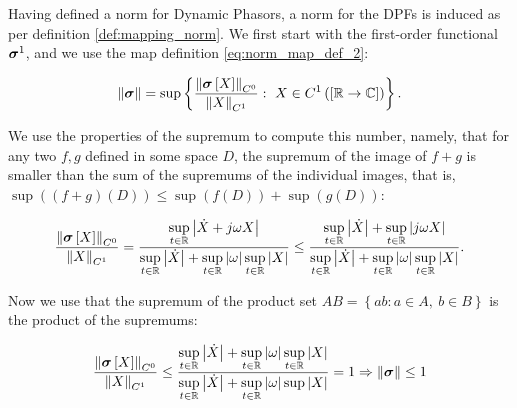 	Having defined a norm for Dynamic Phasors, a norm for the DPFs is induced as per definition \ref{def:mapping_norm}. We first start with the first-order functional $\boldsymbol{\sigma}^{1}$, and we use the map definition \eqref{eq:norm_map_def_2}:

\begin{equation} \left\lVert \dpo\right\rVert = \sup\left\{ \dfrac{\left\lVert \dpo\left[X\right]\right\rVert_{C^0}}{\left\lVert X\right\rVert_{C^1}}:\ X\in C^1\left(\left[\mathbb{R}\to\mathbb{C}\right]\right)\right\} .\end{equation}

	 We use the properties of the supremum to compute this number, namely, that for any two $f,g$ defined in some space $D$, the supremum of the image of $f+g$ is smaller than the sum of the supremums of the individual images, that is, $\sup\left( (f+g)(D)\right) \leq \sup(f(D)) + \sup(g(D))$:

\begin{equation}
	\dfrac{\left\lVert \boldsymbol{\sigma}\left[X\right]\right\rVert_{C^0}}{\left\lVert X\right\rVert_{C^1}} = \dfrac{\sup\limits_{t\in\mathbb{R}}\left\lvert \dot{X} + j\omega X\right\rvert}{\sup\limits_{t\in\mathbb{R}}\left\lvert \dot{X} \right\rvert + \sup\limits_{t\in\mathbb{R}}\left\lvert \omega\right\rvert\sup\limits_{t\in\mathbb{R}}\left\lvert X\right\rvert} \leq \dfrac{\sup\limits_{t\in\mathbb{R}}\left\lvert \dot{X}\right\rvert + \sup\limits_{t\in\mathbb{R}} \left\lvert j\omega X\right\rvert}{\sup\limits_{t\in\mathbb{R}}\left\lvert \dot{X} \right\rvert + \sup\limits_{t\in\mathbb{R}}\left\lvert \omega\right\rvert\sup\limits_{t\in\mathbb{R}}\left\lvert X\right\rvert}. \label{eq:dpo_norm_ratio}
\end{equation}

	Now we use that the supremum of the product set $AB = \left\{ab: a\in A,\ b\in B\right\}$ is the product of the supremums:

\begin{equation}
	\dfrac{\left\lVert \boldsymbol{\sigma}\left[X\right]\right\rVert_{C^0}}{\left\lVert X\right\rVert_{C^1}} \leq \dfrac{\sup\limits_{t\in\mathbb{R}}\left\lvert \dot{X}\right\rvert + \sup\limits_{t\in\mathbb{R}} \left\lvert \omega \right\rvert\sup\limits_{t\in\mathbb{R}}\left\lvert X\right\rvert}{\sup\limits_{t\in\mathbb{R}}\left\lvert \dot{X} \right\rvert + \sup\limits_{t\in\mathbb{R}}\left\lvert \omega\right\rvert\sup\left\lvert X\right\rvert} = 1 \Rightarrow \left\lVert \boldsymbol{\sigma}\right\rVert \leq 1
\end{equation}

